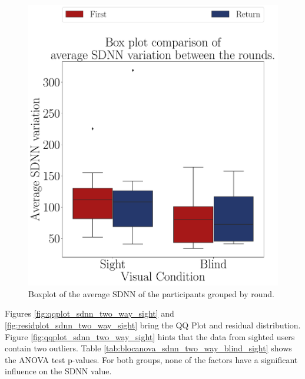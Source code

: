 \begin{figure}[!htb]
\begin{minipage}{0.45\textwidth}
        \centering
        \includegraphics[width = \textwidth]{Resultados/ECG/Figuras/pdf/boxplot_ecg_sdnn_4_rounds.pdf}
        \caption{Boxplot of the average SDNN of the participants grouped by round.}
        \label{fig:boxplot_ecg_sdnn_4_rounds}
    \end{minipage}
\end{figure}
 
%
%

Figures \ref{fig:qqplot_sdnn_two_way_sight} and \ref{fig:residplot_sdnn_two_way_sight} bring the QQ Plot and residual distribution. Figure \ref{fig:qqplot_sdnn_two_way_sight} hints that the data from sighted users contain two outliers. Table \ref{tab:blocanova_sdnn_two_way_blind_sight} shows the ANOVA test p-values. For both groups, none of the factors have a significant influence on the SDNN value.

